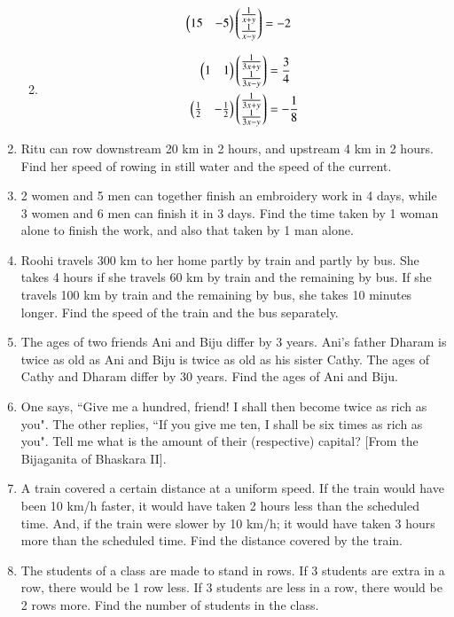 \begin{enumerate}[label=\arabic*.,ref=\thesubsection.\theenumi]
\begin{enumerate}[itemsep=2pt]
\begin{align}
\begin{split}
\begin{pmatrix}15 & -5 \end{pmatrix}\begin{pmatrix}\frac{1}{x+y} \\ \frac{1}{x-y}\end{pmatrix}&=-2
\end{split}
\end{align}
\item 
\begin{align}
\begin{split}
\begin{pmatrix}1 & 1 \end{pmatrix}\begin{pmatrix}\frac{1}{3x+y} \\ \frac{1}{3x-y}\end{pmatrix}&=\frac{3}{4}\\
\begin{pmatrix}\frac{1}{2} & -\frac{1}{2} \end{pmatrix}\begin{pmatrix}\frac{1}{3x+y} \\ \frac{1}{3x-y}\end{pmatrix}&=-\frac{1}{8}
\end{split}
\end{align}
\end{enumerate}
%
\item Ritu can row downstream 20 km in 2 hours, and upstream 4 km in 2 hours. Find her speed of rowing in still water and the speed of the current.
\item  2 women and 5 men can together finish an embroidery work in 4 days, while 3 women and 6 men can finish it in 3 days. Find the time taken by 1 woman alone to finish the work, and also that taken by 1 man alone.
\item  Roohi travels 300 km to her home partly by train and partly by bus. She takes 4 hours if she travels 60 km by train and the remaining by bus. If she travels 100 km by train and the remaining by bus, she takes 10 minutes longer. Find the speed of the train and the bus separately.
\item The ages of two friends Ani and Biju differ by 3 years. Ani’s father Dharam is twice as old as Ani and Biju is twice as old as his sister Cathy. The ages of Cathy and Dharam differ by 30 years. Find the ages of Ani and Biju.
\item One says, ``Give me a hundred, friend! I shall then become twice as rich as you". The other replies, ``If you give me ten, I shall be six times as rich as you". Tell me what is the amount of their (respective) capital? [From the Bijaganita of Bhaskara II]. 
\item A train covered a certain distance at a uniform speed. If the train would have been 10 km/h faster, it would have taken 2 hours less than the scheduled time. And, if the train were slower by 10 km/h; it would have taken 3 hours more than the scheduled time. Find the distance covered by the train.
\item The students of a class are made to stand in rows. If 3 students are extra in a row, there would be 1 row less. If 3 students are less in a row, there would be 2 rows more. Find the number of students in the class.


\end{enumerate}
